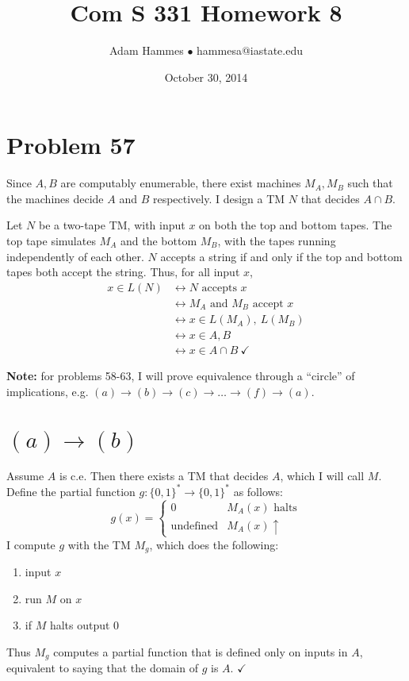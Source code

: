 \documentclass[11pt]{article}
\let\iff\leftrightarrow
\let\imp\rightarrow
\begin{document}
\title{Com S 331 Homework 8}
\author{Adam Hammes $\bullet$ hammesa@iastate.edu}
\date{October 30, 2014}
\maketitle

\section*{Problem 57}

Since $A, B$ are computably enumerable, there exist machines $M_A, M_B$ such that the machines decide $A$ and $B$ respectively.
I design a TM $N$ that decides $A \cap B$.

Let $N$ be a two-tape TM, with input $x$ on both the top and bottom tapes. 
The top tape simulates $M_A$ and the bottom $M_B$, with the tapes running independently of each other.
$N$ accepts a string if and only if the top and bottom tapes both accept the string. Thus, for all input $x$,
\begin{align*}
	x \in L(N) &\iff N \text{ accepts } x \\
	&\iff M_A \text{ and } M_B \text{ accept } x \\
	&\iff x \in L(M_A),\ L(M_B) \\
	&\iff x \in A, B \\
	&\iff x \in A \cap B \ \checkmark
\end{align*}


\textbf{Note:} for problems 58-63, I will prove equivalence through a ``circle'' of implications, e.g. $(a) \imp (b) \imp (c) \imp \ldots \imp (f) \imp (a)$.

\section*{$(a) \imp (b)$}

Assume $A$ is c.e.
Then there exists a TM that decides $A$, which I will call $M$.
Define the partial function $g: \{0,1\}^* \imp \{0,1\}^* $ as follows:
\[g(x) =
	\begin{cases}
		0 & M_A(x) \text{ halts} \\
		\text{undefined} & M_A(x) \uparrow
	\end{cases}
\]
I compute $g$ with the TM $M_g$, which does the following:
\begin{enumerate}
	\item input $x$
	\item run $M$ on $x$
	\item if $M$ halts output 0 
\end{enumerate}

Thus $M_g$ computes a partial function that is defined only on inputs in $A$, equivalent to saying that the domain of $g$ is $A$. $\checkmark$
\end{document}
